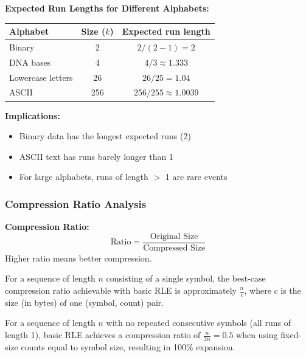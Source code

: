 \begin{examplebox}
\textbf{Expected Run Lengths for Different Alphabets:}

\begin{tabular}{|l|c|c|}
\hline
\textbf{Alphabet} & \textbf{Size ($k$)} & \textbf{Expected run length} \\
\hline
Binary & 2 & $2/(2-1) = 2$ \\
DNA bases & 4 & $4/3 \approx 1.333$ \\
Lowercase letters & 26 & $26/25 = 1.04$ \\
ASCII & 256 & $256/255 \approx 1.0039$ \\
\hline
\end{tabular}

\textbf{Implications:}
\begin{itemize}
    \item Binary data has the longest expected runs (2)
    \item ASCII text has runs barely longer than 1
    \item For large alphabets, runs of length $>$ 1 are rare events
\end{itemize}
\end{examplebox}

\subsubsection{Compression Ratio Analysis}

\begin{definitionbox}
\textbf{Compression Ratio:} 
\[
\text{Ratio} = \frac{\text{Original Size}}{\text{Compressed Size}}
\]
Higher ratio means better compression.
\end{definitionbox}

\begin{theorem}
For a sequence of length $n$ consisting of a single symbol, the best-case compression ratio achievable with basic RLE is approximately $\frac{n}{c}$, where $c$ is the size (in bytes) of one (symbol, count) pair.
\end{theorem}

\begin{theorem}
For a sequence of length $n$ with no repeated consecutive symbols (all runs of length 1), basic RLE achieves a compression ratio of $\frac{n}{2n} = 0.5$ when using fixed-size counts equal to symbol size, resulting in 100\% expansion.
\end{theorem}

